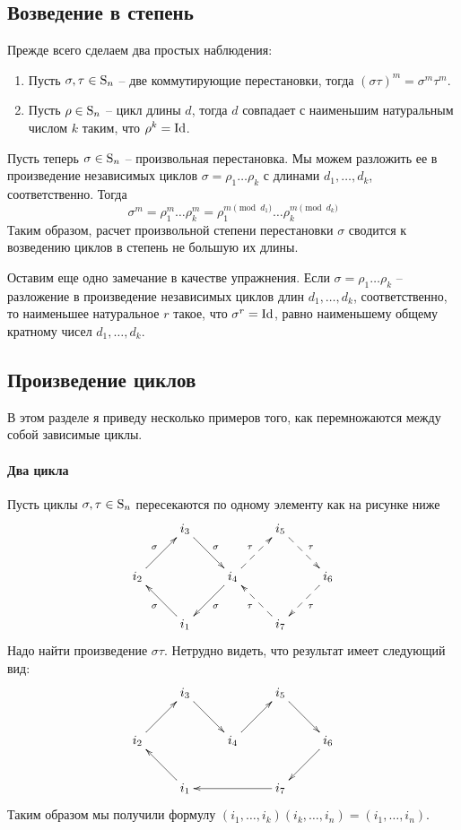 \subsection{Возведение в степень}
\label{section::PermPowerSimple}

Прежде всего сделаем два простых наблюдения:
\begin{enumerate}
\item Пусть $\sigma, \tau\in \operatorname{S}_{n}$ -- две коммутирующие перестановки, тогда $(\sigma \tau)^m = \sigma^m \tau^m$.

\item Пусть $\rho \in\operatorname{S}_{n}$ -- цикл длины $d$, тогда $d$ совпадает с наименьшим натуральным числом $k$ таким, что $\rho^k = \operatorname{Id}$.
\end{enumerate}

Пусть теперь $\sigma\in\operatorname{S}_{n}$ -- произвольная перестановка.
Мы можем разложить ее в произведение независимых циклов $\sigma = \rho_1 \ldots \rho_k$ с длинами $d_1, \ldots, d_k$, соответственно.
Тогда 
\[
\sigma^m = \rho_1^m \ldots \rho_k^m = \rho_1^{m\pmod{d_1}}\ldots \rho_k^{m \pmod{d_k}}
\]
Таким образом, расчет произвольной степени перестановки $\sigma$ сводится к возведению циклов в степень не большую их длины.

Оставим еще одно замечание в качестве упражнения.
Если $\sigma = \rho_1\ldots \rho_k$ -- разложение в произведение независимых циклов длин $d_1,\ldots,d_k$, соответственно, то наименьшее натуральное $r$ такое, что $\sigma^r = \operatorname{Id}$, равно наименьшему общему кратному чисел $d_1,\ldots,d_k$.

\subsection{Произведение циклов}

В этом разделе я приведу несколько примеров того, как перемножаются между собой зависимые циклы.

\paragraph{Два цикла}

Пусть циклы $\sigma,\tau\in \operatorname{S}_{n}$ пересекаются по одному элементу как на рисунке ниже
\[
\xymatrix{
	{}&{i_3}\ar[dr]^{\sigma}&{}&{i_5}\ar@{-->}[dr]^{\tau}&{}\\
	{i_2}\ar[ur]^{\sigma}&{}&{i_4}\ar[dl]^{\sigma}\ar@{-->}[ur]^{\tau}&{}&{i_6}\ar@{-->}[dl]^{\tau}\\
	{}&{i_1}\ar[ul]^{\sigma}&{}&{i_7}\ar@{-->}[ul]^{\tau}&{}\\
}
\]
Надо найти произведение $\sigma\tau$.
Нетрудно видеть, что результат имеет следующий вид:
\[
\xymatrix{
	{}&{i_3}\ar[dr]&{}&{i_5}\ar[dr]&{}\\
	{i_2}\ar[ur]&{}&{i_4}
	\ar[ur]&{}&{i_6}\ar[dl]\\
	{}&{i_1}\ar[ul]&{}&{i_7}\ar[ll]&{}\\
}
\]
Таким образом мы получили формулу $(i_1,\ldots,i_k)(i_k,\ldots,i_n) = (i_1,\ldots,i_n)$.

